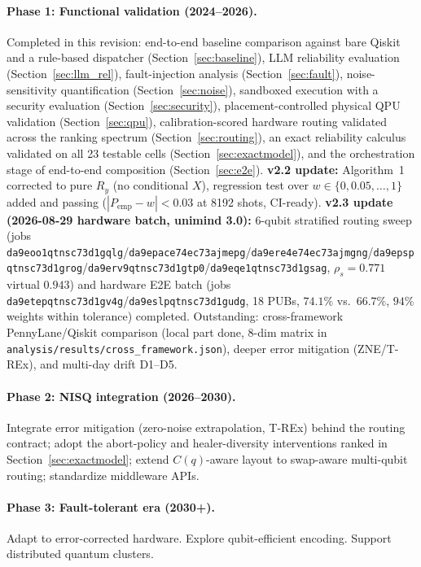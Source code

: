 ﻿\documentclass[12pt,a4paper]{article}
\begin{document}
\paragraph{Phase 1: Functional validation (2024--2026).} Completed in this revision: end-to-end baseline comparison against bare Qiskit and a rule-based dispatcher (Section~\ref{sec:baseline}), LLM reliability evaluation (Section~\ref{sec:llm_rel}), fault-injection analysis (Section~\ref{sec:fault}), noise-sensitivity quantification (Section~\ref{sec:noise}), sandboxed execution with a security evaluation (Section~\ref{sec:security}), placement-controlled physical QPU validation (Section~\ref{sec:qpu}), calibration-scored hardware routing validated across the ranking spectrum (Section~\ref{sec:routing}), an exact reliability calculus validated on all 23 testable cells (Section~\ref{sec:exactmodel}), and the orchestration stage of end-to-end composition (Section~\ref{sec:e2e}). \textbf{v2.2 update:} Algorithm~1 corrected to pure $R_y$ (no conditional $X$), regression test over $w\in\{0,0.05,\ldots,1\}$ added and passing ($|P_{\mathrm{emp}}-w|<0.03$ at 8192 shots, CI-ready). \textbf{v2.3 update (2026-08-29 hardware batch, unimind 3.0):} 6-qubit stratified routing sweep (jobs \texttt{da9eoo1qtnsc73d1gqlg}/\texttt{da9epace74ec73ajmepg}/\texttt{da9ere4e74ec73ajmgng}/\texttt{da9epspqtnsc73d1grog}/\texttt{da9erv9qtnsc73d1gtp0}/\texttt{da9eqe1qtnsc73d1gsag}, $\rho_s=0.771$ virtual $0.943$) and hardware E2E batch (jobs \texttt{da9etepqtnsc73d1gv4g}/\texttt{da9eslpqtnsc73d1gudg}, 18 PUBs, $74.1\%$ vs.\ $66.7\%$, $94\%$ weights within tolerance) completed. Outstanding: cross-framework PennyLane/Qiskit comparison (local part done, $8$-dim matrix in \texttt{analysis/results/cross\_framework.json}), deeper error mitigation (ZNE/T-REx), and multi-day drift D1--D5.

\paragraph{Phase 2: NISQ integration (2026--2030).} Integrate error mitigation (zero-noise extrapolation, T-REx) behind the routing contract; adopt the abort-policy and healer-diversity interventions ranked in Section~\ref{sec:exactmodel}; extend $C(q)$-aware layout to swap-aware multi-qubit routing; standardize middleware APIs.

\paragraph{Phase 3: Fault-tolerant era (2030+).} Adapt to error-corrected hardware. Explore qubit-efficient encoding. Support distributed quantum clusters.
\end{document}
